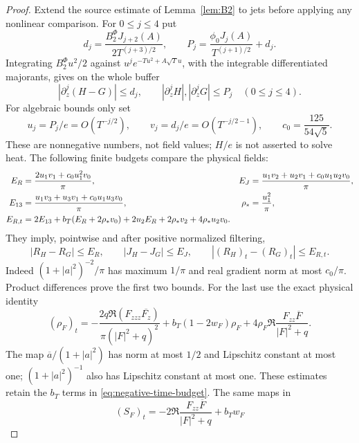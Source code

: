 \begin{proof}
Extend the source estimate of Lemma~\ref{lem:B2} to jets before applying
any nonlinear comparison. For $0\le j\le4$ put
\begin{equation}
 d_j=\frac{B_2^{\Phi}J_{j+2}(A)}{2T^{(j+3)/2}},\qquad
 P_j=\frac{\phi_0J_j(A)}{T^{(j+1)/2}}+d_j.
 \label{eq:negative-source-jets}
\end{equation}
Integrating $B_2^{\Phi}u^2/2$ against
$u^je^{-Tu^2+A\sqrt T u}$, with the integrable differentiated
majorants, gives on the whole buffer
\begin{equation}
 |\partial_z^j(H-G)|\le d_j,\qquad
 |\partial_z^jH|,|\partial_z^jG|\le P_j\quad(0\le j\le4).
 \label{eq:negative-field-jets}
\end{equation}
For algebraic bounds only set
\[
 u_j=P_j/e=O(T^{-j/2}),\qquad
 v_j=d_j/e=O(T^{-j/2-1}),\qquad c_0=\frac{125}{54\sqrt5}.
\]
These are nonnegative numbers, not field values; $H/e$ is not asserted
to solve heat. The following finite budgets compare the physical fields:
\begin{align}
 E_R&=\frac{2u_1v_1+c_0u_1^2v_0}{\pi},&
 E_J&=\frac{u_1v_2+u_2v_1+c_0u_1u_2v_0}{\pi},\notag\\
 E_{13}&=\frac{u_1v_3+u_3v_1+c_0u_1u_3v_0}{\pi},&
 \rho_*&=\frac{u_1^2}{\pi},
 \label{eq:negative-direct-budgets}\\
 E_{R,t}&=2E_{13}+b_T(E_R+2\rho_*v_0)
       +2u_2E_R+2\rho_*v_2+4\rho_*u_2v_0.
 \label{eq:negative-time-budget}
\end{align}
They imply, pointwise and after positive normalized filtering,
\begin{equation}
 |R_H-R_G|\le E_R,\qquad |J_H-J_G|\le E_J,\qquad
 |(R_H)_t-(R_G)_t|\le E_{R,t}.
 \label{eq:negative-RJ-bounds}
\end{equation}
Indeed $(1+|a|^2)^{-2}/\pi$ has maximum $1/\pi$ and
real gradient norm at most $c_0/\pi$. Product differences prove the
first two bounds. For the last use the exact physical identity
\begin{equation}
 (\rho_F)_t=-\frac{2q\Re(F_{zzz}\overline{F_z})}
 {\pi(|F|^2+q)^2}+b_T(1-2w_F)\rho_F
 +4\rho_F\Re\frac{F_{zz}\overline F}{|F|^2+q}.
 \label{eq:negative-density-time}
\end{equation}
The map $\overline a/(1+|a|^2)$ has norm at most $1/2$ and
Lipschitz constant at most one; $(1+|a|^2)^{-1}$ also has Lipschitz
constant at most one. These estimates retain the
$b_T$ terms in \eqref{eq:negative-time-budget}. The same maps in
\[
 (S_F)_t=-2\Re\frac{F_{zz}\overline F}{|F|^2+q}+b_Tw_F
\]
\end{proof}
